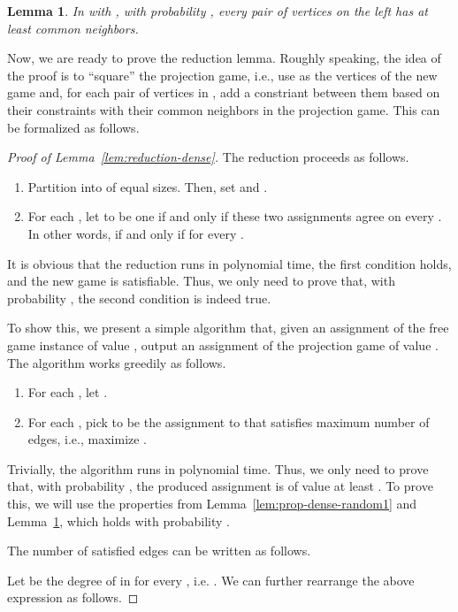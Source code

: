 \documentclass{article}
\newtheorem{lemma}{Lemma}
\begin{document}
\begin{lemma} \label{lem:prop-dense-random2}
In  with , with probability , every pair of vertices  on the left has at least  common neighbors.
\end{lemma}

Now, we are ready to prove the reduction lemma. Roughly speaking, the idea of the proof is to ``square'' the projection game, i.e., use  as the vertices of the new game and, for each pair of vertices in , add a constriant between them based on their constraints with their common neighbors in the projection game. This can be formalized as follows.

\begin{proof}[Proof of Lemma~\ref{lem:reduction-dense}]
The reduction proceeds as follows.
\begin{enumerate} \itemsep0em
\item Partition  into  of equal sizes. Then, set  and .
\item For each , let  to be one if and only if these two assignments agree on every . In other words,  if and only if  for every .
\end{enumerate}

It is obvious that the reduction runs in polynomial time, the first condition holds, and the new game is satisfiable. Thus, we only need to prove that, with probability , the second condition is indeed true.

To show this, we present a simple algorithm that, given an assignment  of the free game instance of value , output an assignment  of the projection game of value . The algorithm works greedily as follows.
\begin{enumerate} \itemsep0em
\item For each , let .
\item For each , pick  to be the assignment to  that satisfies maximum number of edges, i.e., maximize .
\end{enumerate}

Trivially, the algorithm runs in polynomial time. Thus, we only need to prove that, with probability , the produced assignment is of value at least . To prove this, we will use the properties from Lemma~\ref{lem:prop-dense-random1} and Lemma~\ref{lem:prop-dense-random2}, which holds with probability .

The number of satisfied edges can be written as follows.


Let  be the degree of  in  for every , i.e. . We can further rearrange the above expression as follows.




\end{proof}
\end{document}
